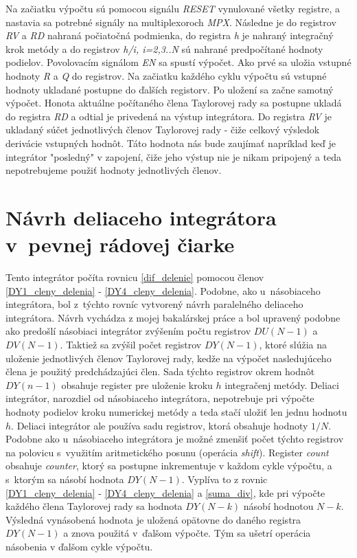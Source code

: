 Na začiatku výpočtu sú pomocou signálu \textit{RESET} vynulované všetky registre, a nastavia sa potrebné signály na multiplexoroch \textit{MPX}. Následne je do registrov \textit{RV} a \textit{RD} nahraná počiatočná podmienka, do registra \textit{h} je nahraný integračný krok metódy a do registrov \textit{h/i, i=2,3..N} sú nahrané predpočítané hodnoty podielov. Povolovacím signálom \textit{EN} sa spustí výpočet. Ako prvé sa uložia vstupné hodnoty \textit{R} a \textit{Q} do registrov. Na začiatku každého cyklu výpočtu sú vstupné hodnoty ukladané postupne do ďalších registorv. Po uložení sa začne samotný výpočet. Honota aktuálne počítaného člena Taylorovej rady sa postupne ukladá do registra \textit{RD} a odtial je privedená na výstup integrátora.
Do registra \textit{RV} je ukladaný súčet jednotlivých členov Taylorovej rady - čiže celkový výsledok derivácie vstupných hodnôt. Táto hodnota nás bude zaujímať napríklad keď je integrátor "posledný" v zapojení, čiže jeho výstup nie je nikam pripojený a teda nepotrebujeme použiť hodnoty jednotlivých členov.


\section{Návrh deliaceho integrátora v~pevnej rádovej čiarke}
Tento integrátor počíta rovnicu \eqref{dif_delenie} pomocou členov \eqref{DY1_cleny_delenia} - \eqref{DY4_cleny_delenia}. Podobne, ako u~násobiaceho integrátora, bol z~týchto rovníc vytvorený návrh paralelného deliaceho integrátora. Návrh vychádza z mojej bakalárskej práce \cite{MatecnyBP} a bol upravený podobne ako predošlí násobiaci integrátor zvýšením počtu registrov $ DU(N-1) $ a $ DV(N-1) $. Taktiež sa zvýšil počet registrov $ DY(N-1) $, ktoré slúžia na uloženie jednotlivých členov Taylorovej rady, kedže na výpočet nasledujúceho člena je použitý predchádzajúci člen. Sada týchto registrov okrem hodnôt $ DY(n-1) $ obsahuje register pre uloženie kroku $ h $ integračenj metódy. Deliaci integrátor, narozdiel od násobiaceho integrátora, nepotrebuje pri výpočte hodnoty podielov kroku numerickej metódy a teda stačí uložiť len jednu hodnotu $ h $. Deliaci integrátor ale používa sadu registrov, ktorá obsahuje hodnoty $ 1/N $. Podobne ako u~násobiaceho integrátora je možné zmenšiť počet týchto registrov na polovicu s~využitím aritmetického posunu (operácia \textit{shift}). Register \textit{count} obsahuje \textit{counter}, ktorý sa postupne inkrementuje v každom cykle výpočtu, a s~ktorým sa násobí hodnota $ DY(N-1) $. Vyplíva to z rovnic \eqref{DY1_cleny_delenia} - \eqref{DY4_cleny_delenia} a \eqref{suma_div}, kde pri výpočte každého člena Taylorovej rady sa hodnota $ DY(N - k) $ násobí hodnotou $ N - k $. Výsledná vynásobená hodnota je uložená opätovne do daného registra $ DY(N-1) $ a znova použitá v~ďalšom výpočte. Tým sa ušetrí operácia násobenia v ďalšom cykle výpočtu.


